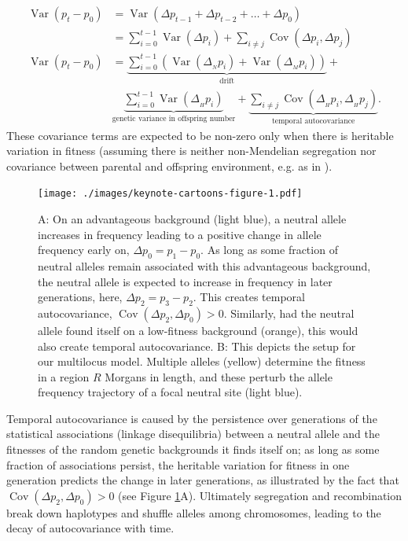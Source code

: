 \documentclass[11pt]{article}
\newcommand{\nnn}{\nonumber}
\DeclareMathOperator{\var}{Var}
\DeclareMathOperator{\cov}{Cov}
\begin{document}
\begin{align}
  \label{eq:var-decomp}
  \var(p_t - p_0) &= \var(\Delta p_{t-1} + \Delta p_{t-2} + \ldots + \Delta p_0) \nnn \\
                  &= \sum_{i=0}^{t-1} \var(\Delta p_i) + \sum_{i \ne j} \cov(\Delta p_{i}, \Delta p_{j}) \nnn \\
  \var(p_t - p_0) &= \underbrace{\sum_{i=0}^{t-1} \left(\var(\Delta_{_N} p_i) +  \var(\Delta_{_M} p_i) \right)}_\text{drift} +  \nonumber\\ 
                  &\underbrace{\sum_{i=0}^{t-1} \var(\Delta_{_H} p_i)}_\text{genetic variance in offspring number} + \underbrace{\sum_{i \ne j} \cov(\Delta_{_H} p_i, \Delta_{_H} p_j)}_\text{temporal autocovariance}.
\end{align}
%
These covariance terms are expected to be non-zero only when there is heritable
variation in fitness (assuming there is neither non-Mendelian segregation nor
covariance between parental and offspring environment, e.g. as in
\cite{Heyer2005-cl}).

\begin{figure}[!ht]
  \centering
  \texttt{[image: ./images/keynote-cartoons-figure-1.pdf]}

  \caption{A: On an advantageous background (light blue), a neutral allele
    increases in frequency leading to a positive change in allele frequency
    early on, $\Delta p_0 = p_1 - p_0$. As long as some fraction of neutral
    alleles remain associated with this advantageous background, the neutral
    allele is expected to increase in frequency in later generations, here,
    $\Delta p_2 = p_3 - p_2$. This creates temporal autocovariance,
    $\cov(\Delta p_2, \Delta p_0) > 0$. Similarly, had the neutral allele found
    itself on a low-fitness background (orange), this would also create temporal
    autocovariance.  B: This depicts the setup for our multilocus model.
    Multiple alleles (yellow) determine the fitness in a region $R$ 
    Morgans in length, and these perturb the allele frequency trajectory 
    of a focal neutral site (light blue). 
  }
  \label{fig:cartoon}
\end{figure}

Temporal autocovariance is caused by the persistence over generations of the
statistical associations (linkage disequilibria) between a neutral allele and
the fitnesses of the random genetic backgrounds it finds itself on; as long as
some fraction of associations persist, the heritable variation for fitness in
one generation predicts the change in later generations, as illustrated by the
fact that $\cov(\Delta p_2, \Delta p_0) > 0$ (see Figure \ref{fig:cartoon}A).
Ultimately segregation and recombination break down haplotypes and shuffle
alleles among chromosomes, leading to the decay of autocovariance with time. 
\end{document}
